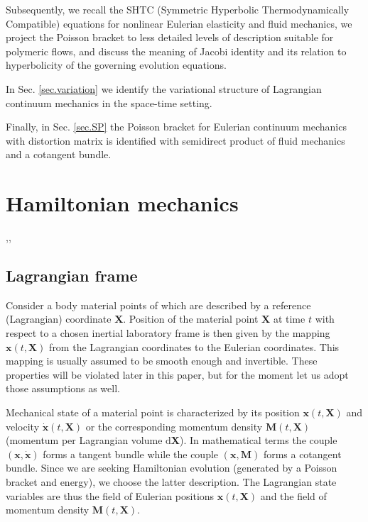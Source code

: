 \documentclass[
10pt, %
a4paper, %
oneside, %
headinclude,footinclude, %
BCOR5mm, %
]{scrartcl}
\newcommand{\xx}{\mathbf{x}}
\newcommand{\XX}{\mathbf{X}}
\newcommand{\diff}{\mathrm{d}}
\newcommand{\MM}{\mathbf{M}}
\begin{document}
Subsequently, we recall the SHTC (Symmetric Hyperbolic Thermodynamically Compatible) equations for nonlinear Eulerian elasticity and fluid mechanics, we project the Poisson bracket to less detailed levels of description suitable for polymeric flows, and discuss the meaning of Jacobi identity and its relation to hyperbolicity of the governing evolution equations.

In Sec. \ref{sec.variation} we identify the variational structure of Lagrangian continuum mechanics in the space-time setting.

Finally, in Sec. \ref{sec.SP} the Poisson bracket for Eulerian continuum mechanics with distortion matrix is identified with semidirect product of fluid mechanics and a cotangent bundle.


\section{Hamiltonian mechanics}
\cite{HCO},\cite{PKG}, \cite{Markus2009}

\subsection{Lagrangian frame}
Consider a body material points of which are described by a reference (Lagrangian) coordinate $\XX$. Position of the material point $\XX$ at time $t$ with respect to a chosen inertial laboratory frame is then given by the mapping $\xx(t,\XX)$ from the Lagrangian coordinates to the Eulerian coordinates. This mapping is usually assumed to be smooth enough and invertible. These properties will be violated later in this paper, but for the moment let us adopt those assumptions as well. 

Mechanical state of a material point is characterized by its position $\xx(t,\XX)$ and velocity $\dot{\xx}(t,\XX)$ or the corresponding momentum density $\MM(t,\XX)$ (momentum per Lagrangian volume $\diff \XX$). In mathematical terms the couple $(\xx,\dot{\xx})$ forms a tangent bundle while the couple $(\xx,\MM)$ forms a cotangent bundle. Since we are seeking Hamiltonian evolution (generated by a Poisson bracket and energy), we choose the latter description. The Lagrangian state variables are thus the field of Eulerian positions $\xx(t,\XX)$ and the field of momentum density $\MM(t,\XX)$. 
\end{document}
